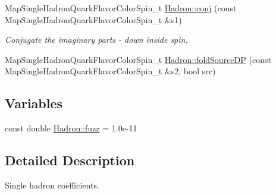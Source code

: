 \begin{DoxyCompactItemize}
Map\+Single\+Hadron\+Quark\+Flavor\+Color\+Spin\+\_\+t \mbox{\hyperlink{namespaceHadron_a225bbef2231c488eb28201396913bae0}{Hadron\+::conj}} (const Map\+Single\+Hadron\+Quark\+Flavor\+Color\+Spin\+\_\+t \&s1)
\begin{DoxyCompactList}\small\item\em Conjugate the imaginary parts -\/ down inside spin. \end{DoxyCompactList}\item 
Map\+Single\+Hadron\+Quark\+Flavor\+Color\+Spin\+\_\+t \mbox{\hyperlink{namespaceHadron_a273b8ceda53ab61615d67cead7c42d94}{Hadron\+::fold\+Source\+DP}} (const Map\+Single\+Hadron\+Quark\+Flavor\+Color\+Spin\+\_\+t \&s2, bool src)
\end{DoxyCompactItemize}
\subsection*{Variables}
\begin{DoxyCompactItemize}
\item 
const double \mbox{\hyperlink{namespaceHadron_a3ad10e2a91a0e758b6b378c0c2f57fc8}{Hadron\+::fuzz}} = 1.\+0e-\/11
\end{DoxyCompactItemize}


\subsection{Detailed Description}
Single hadron coefficients. 

